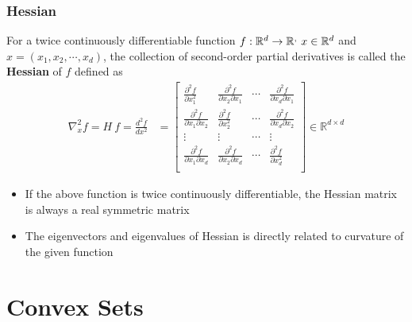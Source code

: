 \begin{frame}\frametitle{Hessian}
    For a twice continuously differentiable function $f:{\mathbb R}^{d}\to{\mathbb R}^{,}\ x\in{\mathbb R}^{d}$ and $x=(x_1,x_2,\cdots,x_d)$, the collection of second-order partial derivatives
    is called the \textbf{Hessian} of $f$ defined as
    \begin{align*}
        \nabla_x^2f=H\ f=\frac{d^2f}{dx^2}&= \begin{bmatrix}
            \frac{\partial^2 f}{\partial x_1^2} & \frac{\partial^2 f}{\partial x_2 \partial x_1} &\cdots & \frac{\partial^2 f}{\partial x_d \partial x_1} \\
            \frac{\partial^2 f}{\partial x_1\partial x_2} & \frac{\partial^2 f}{\partial x_2^2} &\cdots & \frac{\partial^2 f}{\partial x_d \partial x_2} \\
            \vdots&\vdots&\cdots&\vdots \\
            \frac{\partial^2 f}{\partial x_1\partial x_d} & \frac{\partial^2 f}{\partial x_2\partial x_d} &\cdots & \frac{\partial^2 f}{\partial x_d^2} \\
             \end{bmatrix}\in\mathbb{R}^{d\times d}
      \end{align*}
      \begin{itemize}
        \item If the above function is twice continuously differentiable, the Hessian matrix is always a real symmetric matrix
        \item The eigenvectors and eigenvalues of Hessian is directly related to curvature of the given function
      \end{itemize}      
\end{frame}



\section{Convex Sets}

